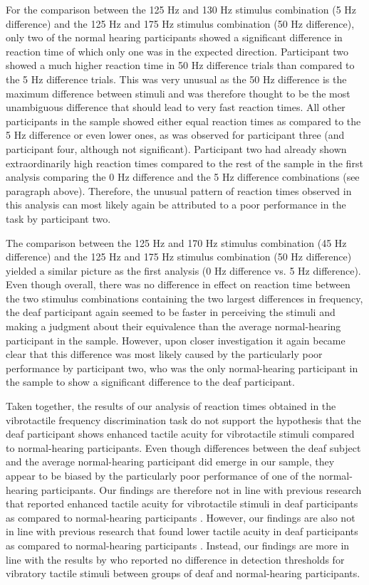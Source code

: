\documentclass[12pt]{article}
\begin{document}
\par For the comparison between the 125 Hz and 130 Hz stimulus combination (5 Hz difference) and the 125 Hz and 175 Hz stimulus combination (50 Hz difference), only two of the normal hearing participants showed a significant difference in reaction time of which only one was in the expected direction. Participant two showed a much higher reaction time in 50 Hz difference trials than compared to the 5 Hz difference trials. This was very unusual as the 50 Hz difference is the maximum difference between stimuli and was therefore thought to be the most unambiguous difference that should lead to very fast reaction times. All other participants in the sample showed either equal reaction times as compared to the 5 Hz difference or even lower ones, as was observed for participant three (and participant four, although not significant). Participant two had already shown extraordinarily  high reaction times compared to the rest of the sample in the first analysis comparing the 0 Hz difference and the 5 Hz difference combinations (see paragraph above). Therefore, the unusual pattern of reaction times observed in this analysis can most likely again be attributed to a poor performance in the task by participant two.
%
\par The comparison between the 125 Hz and 170 Hz stimulus combination (45 Hz difference) and the 125 Hz and 175 Hz stimulus combination (50 Hz difference) yielded a similar picture as the first analysis (0 Hz difference vs. 5 Hz difference). Even though overall, there was no difference in effect on reaction time between the two stimulus combinations containing the two largest differences in frequency, the deaf participant again seemed to be faster in perceiving the stimuli and making a judgment about their equivalence than the average normal-hearing participant in the sample. However, upon closer investigation it again became clear that this difference was most likely caused by the particularly poor performance by participant two, who was the only normal-hearing participant in the sample to show a significant difference to the deaf participant.
%
\par Taken together, the results of our analysis of reaction times obtained in the vibrotactile frequency discrimination task do not support the hypothesis that the deaf participant shows enhanced tactile acuity for vibrotactile stimuli compared to normal-hearing participants. Even though differences between the deaf subject and the average normal-hearing participant did emerge in our sample, they appear to be biased by the particularly poor performance of one of the normal-hearing participants. Our findings are therefore not in line with previous research that reported enhanced tactile acuity for vibrotactile stimuli in deaf participants as compared to normal-hearing participants \parencite{levanen_feeling_2001,schiff_deaf_1972}. However, our findings are also not in line with previous research that found lower tactile acuity in deaf participants as compared to normal-hearing participants \parencite{frenzel_genetic_2012,moshourab_congenital_2017}. Instead, our findings are more in line with the results by \cite{moallem_measures_2010} who reported no difference in detection thresholds for vibratory tactile stimuli between groups of deaf and normal-hearing participants.
\end{document}

